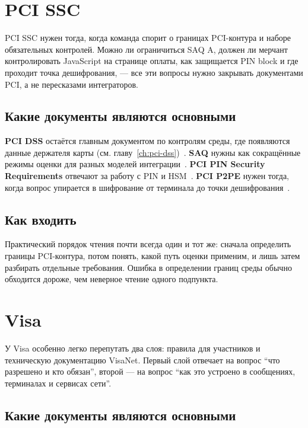 \section{PCI SSC}
\label{sec:ps-pci}

PCI SSC нужен тогда, когда команда спорит о границах PCI-контура
и наборе обязательных контролей. Можно ли ограничиться SAQ A, должен ли
мерчант контролировать JavaScript на странице оплаты, как защищается
PIN block и где проходит точка дешифрования, — все эти вопросы
нужно закрывать документами PCI, а не пересказами интеграторов.

\subsection*{Какие документы являются основными}

\textbf{PCI DSS} остаётся главным документом по контролям среды,
где появляются данные держателя карты
(см. главу~\ref{ch:pci-dss})~\cite{pci-dss-4}. \textbf{SAQ} нужны как
сокращённые
режимы оценки для разных моделей интеграции~\cite{pci-saq}.
\textbf{PCI PIN Security Requirements} отвечают за работу
с PIN и HSM~\cite{pci-pin-security}. \textbf{PCI P2PE} нужен тогда, когда вопрос
упирается в шифрование от терминала до точки дешифрования~\cite{pci-p2pe}.

\subsection*{Как входить}

Практический порядок чтения почти всегда один и тот же: сначала
определить границы PCI-контура, потом понять, какой путь оценки
применим, и лишь затем разбирать отдельные требования. Ошибка
в определении границ среды обычно обходится дороже, чем неверное
чтение одного подпункта.

\section{Visa}
\label{sec:ps-visa}

У Visa особенно легко перепутать два слоя: правила
для участников и техническую документацию VisaNet. Первый слой
отвечает на вопрос \enquote{что разрешено и кто обязан}, второй —
на вопрос \enquote{как это устроено в сообщениях, терминалах
и сервисах сети}.

\subsection*{Какие документы являются основными}

